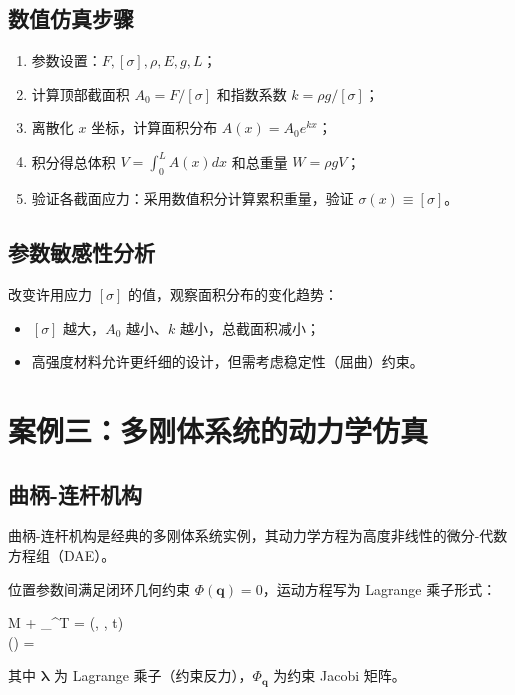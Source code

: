 \subsection{数值仿真步骤}

\begin{enumerate}
	\item 参数设置：$F, [\sigma], \rho, E, g, L$；
	\item 计算顶部截面积 $A_0 = F / [\sigma]$ 和指数系数 $k = \rho g / [\sigma]$；
	\item 离散化 $x$ 坐标，计算面积分布 $A(x) = A_0 e^{kx}$；
	\item 积分得总体积 $V = \int_{0}^{L} A(x) dx$ 和总重量 $W = \rho g V$；
	\item 验证各截面应力：采用数值积分计算累积重量，验证 $\sigma(x) \equiv [\sigma]$。
\end{enumerate}

\subsection{参数敏感性分析}

改变许用应力 $[\sigma]$ 的值，观察面积分布的变化趋势：
\begin{itemize}
	\item $[\sigma]$ 越大，$A_0$ 越小、$k$ 越小，总截面积减小；
	\item 高强度材料允许更纤细的设计，但需考虑稳定性（屈曲）约束。
\end{itemize}

\section{案例三：多刚体系统的动力学仿真}

\subsection{曲柄-连杆机构}

曲柄-连杆机构是经典的多刚体系统实例，其动力学方程为高度非线性的微分-代数方程组（DAE）。

位置参数间满足闭环几何约束 $\Phi(\mathbf{q}) = 0$，运动方程写为 Lagrange 乘子形式：
\begin{myformula}
	\begin{cases}
		M  + \Phi_{}^T \boldsymbol{\lambda} = (, , t) \\
		\Phi() = 
	\end{cases}
\end{myformula}
其中 $\boldsymbol{\lambda}$ 为 Lagrange 乘子（约束反力），$\Phi_{\mathbf{q}}$ 为约束 Jacobi 矩阵。

